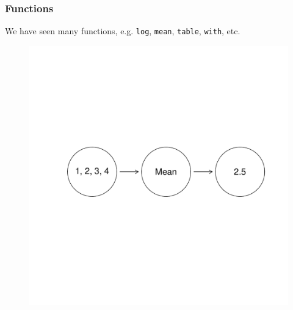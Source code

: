 \documentclass{beamer}\usepackage[]{graphicx}\usepackage[]{color}
\begin{document}
\begin{frame}
  \frametitle{Functions}
\vspace{10pt}
  We have seen many functions, e.g. \texttt{log},
    \texttt{mean}, \texttt{table}, \texttt{with}, etc.

\vspace{-60pt}
\begin{figure}[h]
  \centering
  \includegraphics[height = 0.9\textwidth, keepaspectratio]{Figure/fun2}
  \label{fig:fun2}
\end{figure}
\end{frame}
\end{document}
